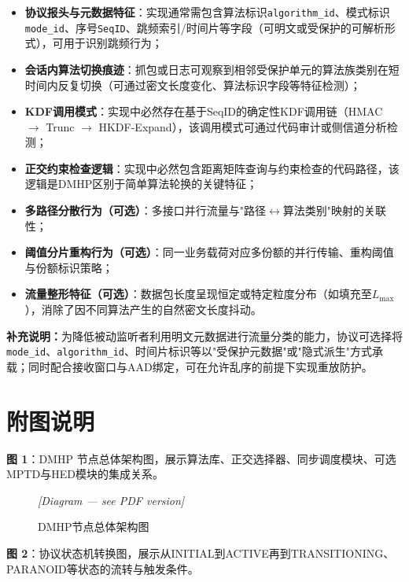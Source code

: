 ﻿\documentclass[12pt,a4paper]{article}
\begin{document}
\begin{itemize}
    \item \textbf{协议报头与元数据特征}：实现通常需包含算法标识\texttt{algorithm\_id}、模式标识\texttt{mode\_id}、序号\texttt{SeqID}、跳频索引/时间片等字段（可明文或受保护的可解析形式），可用于识别跳频行为；
    \item \textbf{会话内算法切换痕迹}：抓包或日志可观察到相邻受保护单元的算法族类别在短时间内反复切换（可通过密文长度变化、算法标识字段等特征检测）；
    \item \textbf{KDF调用模式}：实现中必然存在基于SeqID的确定性KDF调用链（HMAC $\to$ Trunc $\to$ HKDF-Expand），该调用模式可通过代码审计或侧信道分析检测；
    \item \textbf{正交约束检查逻辑}：实现中必然包含距离矩阵查询与约束检查的代码路径，该逻辑是DMHP区别于简单算法轮换的关键特征；
    \item \textbf{多路径分散行为（可选）}：多接口并行流量与"路径$\leftrightarrow$算法类别"映射的关联性；
    \item \textbf{阈值分片重构行为（可选）}：同一业务载荷对应多份额的并行传输、重构阈值与份额标识策略；
    \item \textbf{流量整形特征（可选）}：数据包长度呈现恒定或特定粒度分布（如填充至$L_{\max}$），消除了因不同算法产生的自然密文长度抖动。
\end{itemize}

\noindent\textbf{补充说明：}为降低被动监听者利用明文元数据进行流量分类的能力，协议可选择将\texttt{mode\_id}、\texttt{algorithm\_id}、时间片标识等以"受保护元数据"或"隐式派生"方式承载；同时配合接收窗口与AAD绑定，可在允许乱序的前提下实现重放防护。

\section{附图说明}

\textbf{图 1}：DMHP 节点总体架构图，展示算法库、正交选择器、同步调度模块、可选MPTD与HED模块的集成关系。

\begin{figure}[H]
\centering
\textit{[Diagram — see PDF version]}
\caption{DMHP节点总体架构图}
\end{figure}

\textbf{图 2}：协议状态机转换图，展示从INITIAL到ACTIVE再到TRANSITIONING、PARANOID等状态的流转与触发条件。
\end{document}
